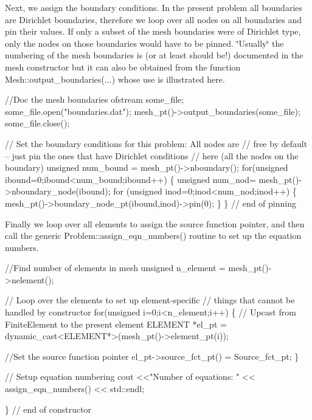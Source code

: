 Next, we assign the boundary conditions. In the present problem all boundaries are Dirichlet boundaries, therefore we loop over all nodes on all boundaries and pin their values. If only a subset of the mesh boundaries were of Dirichlet type, only the nodes on those boundaries would have to be pinned. \char`\"{}\+Usually\char`\"{} the numbering of the mesh boundaries is (or at least should be!) documented in the mesh constructor but it can also be obtained from the function {\ttfamily Mesh\+::output\+\_\+boundaries}(...) whose use is illustrated here.


\begin{DoxyCodeInclude}
 \textcolor{comment}{//Doc the mesh boundaries}
 ofstream some\_file;
 some\_file.open(\textcolor{stringliteral}{"boundaries.dat"});
 mesh\_pt()->output\_boundaries(some\_file);
 some\_file.close();

 \textcolor{comment}{// Set the boundary conditions for this problem: All nodes are}
 \textcolor{comment}{// free by default -- just pin the ones that have Dirichlet conditions}
 \textcolor{comment}{// here (all the nodes on the boundary)}
 \textcolor{keywordtype}{unsigned} num\_bound = mesh\_pt()->nboundary();
 \textcolor{keywordflow}{for}(\textcolor{keywordtype}{unsigned} ibound=0;ibound<num\_bound;ibound++)
  \{
   \textcolor{keywordtype}{unsigned} num\_nod= mesh\_pt()->nboundary\_node(ibound);
   \textcolor{keywordflow}{for} (\textcolor{keywordtype}{unsigned} inod=0;inod<num\_nod;inod++)
    \{
     mesh\_pt()->boundary\_node\_pt(ibound,inod)->pin(0); 
    \}
  \} \textcolor{comment}{// end of pinning}

\end{DoxyCodeInclude}


Finally we loop over all elements to assign the source function pointer, and then call the generic {\ttfamily Problem\+::assign\+\_\+eqn\+\_\+numbers()} routine to set up the equation numbers.


\begin{DoxyCodeInclude}
 \textcolor{comment}{//Find number of elements in mesh}
 \textcolor{keywordtype}{unsigned} n\_element = mesh\_pt()->nelement();

 \textcolor{comment}{// Loop over the elements to set up element-specific }
 \textcolor{comment}{// things that cannot be handled by constructor}
 \textcolor{keywordflow}{for}(\textcolor{keywordtype}{unsigned} i=0;i<n\_element;i++)
  \{
   \textcolor{comment}{// Upcast from FiniteElement to the present element}
   ELEMENT *el\_pt = \textcolor{keyword}{dynamic\_cast<}ELEMENT*\textcolor{keyword}{>}(mesh\_pt()->element\_pt(i));

   \textcolor{comment}{//Set the source function pointer}
   el\_pt->source\_fct\_pt() = Source\_fct\_pt;
  \}

 \textcolor{comment}{// Setup equation numbering }
 cout <<\textcolor{stringliteral}{"Number of equations: "} << assign\_eqn\_numbers() << std::endl; 

\} \textcolor{comment}{// end of constructor}

\end{DoxyCodeInclude}




